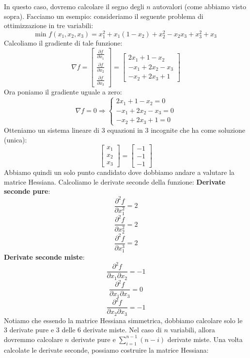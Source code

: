 \documentclass[12pt]{article}
\begin{document}
In questo caso, dovremo calcolare il segno degli $n$ autovalori (come abbiamo visto sopra).
Facciamo un esempio: consideriamo il seguente problema di ottimizzazione in tre variabili:
$$\textrm{min } f(x_1,x_2,x_3) = x_1^2 + x_1(1-x_2) + x_2^2 - x_2x_3+x_3^2 + x_3$$
Calcoliamo il gradiente di tale funzione:
$$\nabla f = \begin{bmatrix}
    \frac{\partial f}{\partial x_1} \\
    \frac{\partial f}{\partial x_2} \\
    \frac{\partial f}{\partial x_3}
\end{bmatrix} = \begin{bmatrix}
    2x_1 + 1 - x_2 \\
    -x_1 + 2x_2 - x_3 \\
    -x_2 + 2x_3 + 1
\end{bmatrix}$$
Ora poniamo il gradiente uguale a zero:
$$\nabla f = 0 \Rightarrow \begin{cases}
    2x_1 + 1 - x_2 = 0 \\
    -x_1 + 2x_2 - x_3 = 0 \\
    -x_2 + 2x_3 + 1 = 0
\end{cases}$$
Otteniamo un sistema lineare di 3 equazioni in 3 incognite che ha come soluzione (unica):
$$\begin{bmatrix}
    x_1 \\
    x_2 \\
    x_3
\end{bmatrix} = \begin{bmatrix}
    -1 \\
    -1 \\
    -1
\end{bmatrix}$$
Abbiamo quindi un solo punto candidato dove dobbiamo andare a valutare la matrice Hessiana.
Calcoliamo le derivate seconde della funzione: \newline
\textbf{Derivate seconde pure}:
$$\frac{\partial^2 f}{\partial x_1^2} = 2$$
$$\frac{\partial^2 f}{\partial x_2^2} = 2$$
$$\frac{\partial^2 f}{\partial x_1^3} = 2$$
\textbf{Derivate seconde miste}:
$$\frac{\partial^2 f}{\partial x_1 \partial x_2} = -1$$
$$\frac{\partial^2 f}{\partial x_1 \partial x_3} = 0$$
$$\frac{\partial^2 f}{\partial x_2 \partial x_3} = -1$$
Notiamo che essendo la matrice Hessiana simmetrica, dobbiamo calcolare solo le 3 derivate pure e 3 delle 6 derivate miste.
Nel caso di $n$ variabili, allora dovremmo calcolare $n$ derivate pure e $\sum_{i=1}^{n-1}(n-i)$ derivate miste. \newline
Una volta calcolate le derivate seconde, possiamo costruire la matrice Hessiana:
\end{document}
